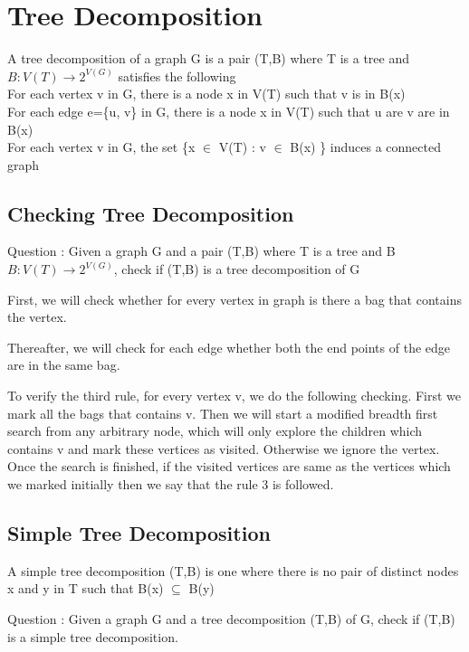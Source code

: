 \chapter{Tree Decomposition}

A tree decomposition of a graph G is a pair (T,B) where T is a tree and $B: V(T) \to 2^{V(G)}$
satisfies the following \\
For each vertex v in G, there is a node x in V(T) such that v is in B(x) \\
For each edge e=\{u, v\} in G, there is a node x in V(T) such that u are v are in B(x) \\
For each vertex v in G, the set \{x $\in$ V(T) : v $\in$ B(x) \} induces a connected graph \\

\section{Checking Tree Decomposition}
Question : Given a graph G and a pair (T,B) where T is a tree and B $B: V(T) \to 2^{V(G)}$, 
 check if (T,B) is a tree decomposition of G

First, we will check whether for every vertex in graph is there a bag that contains
the vertex.

Thereafter, we will check for each edge whether both the end points of the edge
are in the same bag.

To verify the third rule, for every vertex v, we do the following checking.
First we mark all the bags that contains v. Then we will start a modified breadth first search
from any arbitrary node, which will only explore the children which contains v and mark these 
vertices as visited. Otherwise we ignore the vertex. 
Once the search is finished, if the visited vertices are same as the vertices which we marked
initially then we say that the rule 3 is followed.  

\section{Simple Tree Decomposition}
A simple tree decomposition (T,B) is one where there is no pair of distinct nodes x 
and y in T such that B(x) $\subseteq$ B(y)

Question : Given a graph G and a tree decomposition (T,B) of G, 
check if (T,B) is a simple tree decomposition.

